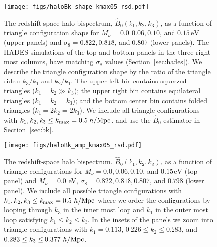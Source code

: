 \documentclass[12pt, letterpaper, preprint]{aastex62}
\newcommand{\smnu}{M_\nu}
\newcommand{\sig}{\sigma_8}
\newcommand{\BOk}{\widehat{B}_0}
\begin{document}
\begin{figure}
\begin{center}
    \texttt{[image: figs/haloBk\_shape\_kmax05\_rsd.pdf]} 
    \caption{The redshift-space halo bispectrum, $\BOk(k_1, k_2, k_3)$, as a 
    function of triangle configuration shape for $\smnu = 0.0, 0.06, 0.10$, 
    and $0.15\,\mathrm{eV}$ (upper panels) and $\sig = 0.822, 0.818$, and 
    $0.807$ (lower panels). The HADES simulations of the top and bottom 
    panels in the three right-most columns, have matching $\sig$ values 
    (Section~\ref{sec:hades}). We describe the triangle configuration shape 
    by the ratio of the triangle sides: $k_3/k_1$ and $k_2/k_1$. The upper 
    left bin contains squeezed triangles ($k_1 = k_2 \gg k_3$); the upper 
    right bin contains equilateral triangles ($k_1 = k_2 = k_3$); and the 
    bottom center bin contains folded triangles ($k_1 = 2 k_2 = 2 k_3$). 
    We include all triangle configurations with $k_1, k_2, k_3 \leq k_{\rm max} = 0.5~h/{\rm Mpc}$. 
    and use the $\BOk$ estimator in Section~\ref{sec:bk}.}
\label{fig:bk_shape}
\end{center}
\end{figure}

\begin{figure}
\begin{center}
\texttt{[image: figs/haloBk\_amp\_kmax05\_rsd.pdf]}
    \caption{The redshift-space halo bispectrum, $\BOk(k_1, k_2, k_3)$, as a
    function of triangle configurations for $\smnu = 0.0, 0.06, 0.10$, 
    and $0.15\,\mathrm{eV}$ (top panel) and $\smnu = 0.0$ eV, $\sig = 0.822, 0.818, 0.807$, 
    and $0.798$ (lower panel). We include all possible triangle configurations 
    with $k_1, k_2, k_3 \leq k_{\rm max} = 0.5~h/{\rm Mpc}$ where we order
    the configurations by looping through $k_3$ in the inner most loop and 
    $k_1$ in the outer most loop satisfying $k_1 \leq k_2 \leq k_3$. In the 
    insets of the panels we zoom into triangle configurations with 
    $k_1 = 0.113$, $0.226 \leq k_2 \leq 0.283$, and $0.283 \leq k_3 \leq 0.377~h/{\rm Mpc}$.}
\label{fig:bk_amp}
\end{center}
\end{figure}


\end{document}
